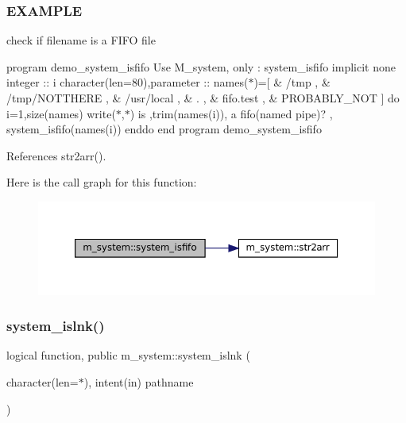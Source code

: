 \subsubsection*{E\+X\+A\+M\+P\+LE}

check if filename is a F\+I\+FO file

program demo\+\_\+system\+\_\+isfifo Use M\+\_\+system, only \+: system\+\_\+isfifo implicit none integer \+:\+: i character(len=80),parameter \+:\+: names($\ast$)=\mbox{[} \& \textquotesingle{}/tmp \textquotesingle{}, \& \textquotesingle{}/tmp/\+N\+O\+T\+T\+H\+E\+RE \textquotesingle{}, \& \textquotesingle{}/usr/local \textquotesingle{}, \& \textquotesingle{}. \textquotesingle{}, \& \textquotesingle{}fifo.\+test \textquotesingle{}, \& \textquotesingle{}P\+R\+O\+B\+A\+B\+L\+Y\+\_\+\+N\+OT \textquotesingle{}\mbox{]} do i=1,size(names) write($\ast$,$\ast$)\textquotesingle{} is \textquotesingle{},trim(names(i)),\textquotesingle{} a fifo(named pipe)? \textquotesingle{}, system\+\_\+isfifo(names(i)) enddo end program demo\+\_\+system\+\_\+isfifo 

References str2arr().

Here is the call graph for this function\+:
\nopagebreak
\begin{figure}[H]
\begin{center}
\leavevmode
\includegraphics[width=350pt]{namespacem__system_acbcaa0c5075ca103815f441ee410e1a3_cgraph}
\end{center}
\end{figure}
\mbox{\label{namespacem__system_ab05694cc3d76a3ecc87e4b4490c4c217}} 
\subsubsection{\texorpdfstring{system\+\_\+islnk()}{system\_islnk()}}
{\footnotesize\ttfamily logical function, public m\+\_\+system\+::system\+\_\+islnk (\begin{DoxyParamCaption}\item[{character(len=$\ast$), intent(in)}]{pathname }\end{DoxyParamCaption})}



